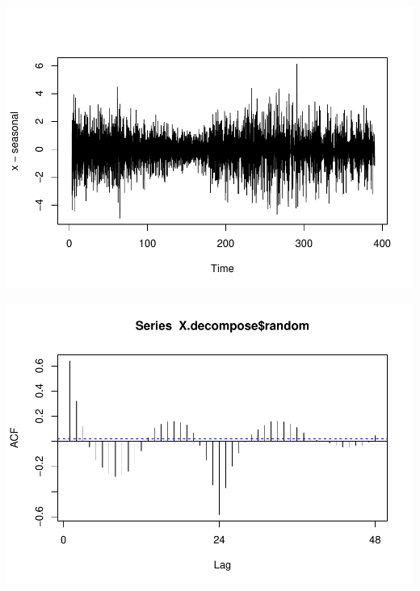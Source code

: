 \documentclass[
]{article}
\newenvironment{Shaded}{\begin{snugshade}}{\end{snugshade}}
\newcommand{\FunctionTok}[1]{\textcolor[rgb]{0.00,0.00,0.00}{#1}}
\newcommand{\NormalTok}[1]{#1}
\newcommand{\SpecialCharTok}[1]{\textcolor[rgb]{0.00,0.00,0.00}{#1}}
\begin{document}
\begin{Shaded}
\end{Shaded}

\includegraphics{STA202_report_files/figure-latex/unnamed-chunk-11-14.pdf}

\begin{Shaded}
\end{Shaded}

\includegraphics{STA202_report_files/figure-latex/unnamed-chunk-11-15.pdf}
\end{document}
